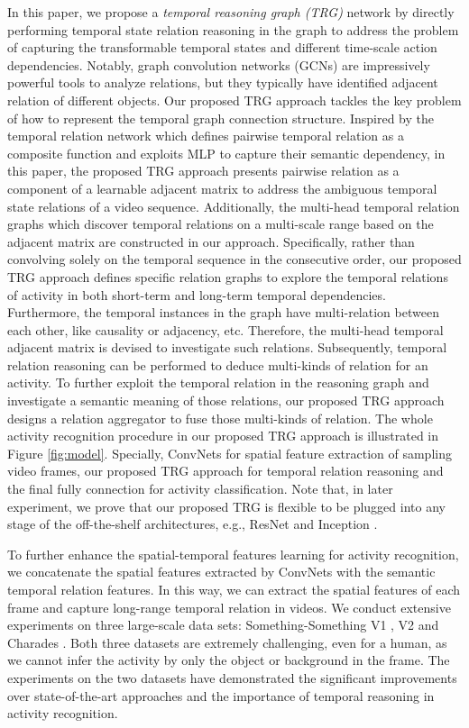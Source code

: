 \documentclass[conference,compsoc]{IEEEtran}
\begin{document}
    In this paper, we propose a \textit{temporal reasoning graph (TRG)} network by directly performing temporal state relation reasoning in the graph to address the problem of capturing the transformable temporal states and different time-scale action dependencies. Notably, graph convolution networks (GCNs) \cite{stgcn2018aaai, zhou2018graph} are impressively powerful tools to analyze relations, but they typically have identified adjacent relation of different objects. Our proposed TRG approach tackles the key problem of how to represent the temporal graph connection structure. Inspired by the temporal relation network \cite{zhou2018temporal} which defines pairwise temporal relation as a composite function and exploits MLP to capture their semantic dependency, in this paper, the proposed TRG approach presents pairwise relation as a component of a learnable adjacent matrix to address the ambiguous temporal state relations of a video sequence. Additionally, the multi-head temporal relation graphs which discover temporal relations on a multi-scale range based on the adjacent matrix are constructed in our approach. Specifically, rather than convolving solely on the temporal sequence in the consecutive order, our proposed TRG approach defines specific relation graphs to explore the temporal relations of activity in both short-term and long-term temporal dependencies. Furthermore, the temporal instances in the graph have multi-relation between each other, like causality or adjacency, etc. Therefore, the multi-head temporal adjacent matrix is devised to investigate such relations. Subsequently, temporal relation reasoning can be performed to deduce multi-kinds of relation for an activity. To further exploit the temporal relation in the reasoning graph and investigate a semantic meaning of those relations, our proposed TRG approach designs a relation aggregator to fuse those multi-kinds of relation. The whole activity recognition procedure in our proposed TRG approach is illustrated in Figure \ref{fig:model}. Specially, ConvNets for spatial feature extraction of sampling video frames, our proposed TRG approach for temporal relation reasoning and the final fully connection for activity classification. Note that, in later experiment, we prove that our proposed TRG is flexible to be plugged into any stage of the off-the-shelf architectures, e.g., ResNet \cite{he2016deep} and Inception \cite{ioffe2015batch}.
    
    To further enhance the spatial-temporal features learning for activity recognition, we concatenate the spatial features extracted by ConvNets with the semantic temporal relation features. In this way, we can extract the spatial features of each frame and capture long-range temporal relation in videos. We conduct extensive experiments on three large-scale data sets: Something-Something V1 \cite{goyal2017something}, V2 \cite{mahdisoltani2018fine} and Charades \cite{sigurdsson2016hollywood}. Both three datasets are extremely challenging, even for a human, as we cannot infer the activity by only the object or background in the frame. The experiments on the two datasets have demonstrated the significant improvements over state-of-the-art approaches and the importance of temporal reasoning in activity recognition.
     
\end{document}
